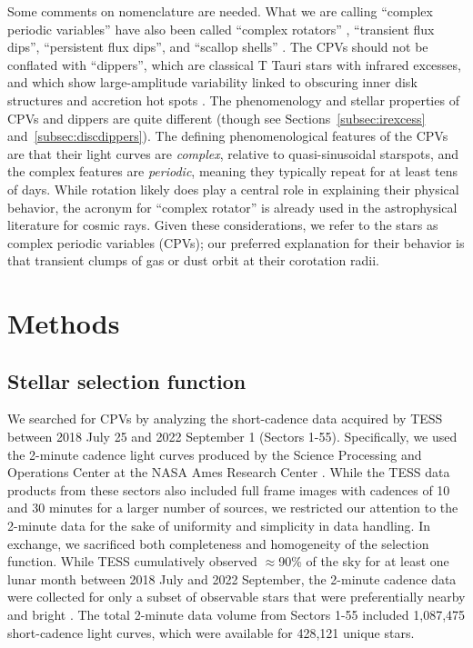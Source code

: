\documentclass[11pt,twocolumn,tighten]{aastex63}
\begin{document}
Some comments on nomenclature are needed.  What we are calling
``complex periodic variables'' \citep{2023MNRAS.518.2921K} have also
been called ``complex rotators''
\citep{2019ApJ...876..127Z,2022AJ....163..144G,2023ApJ...945..114P},
``transient flux dips'', ``persistent flux dips'', and ``scallop
shells'' \citep{2017AJ....153..152S}.  The CPVs should not be
conflated with ``dippers'', which are classical T Tauri stars with
infrared excesses, and which show large-amplitude variability linked
to obscuring inner disk structures and accretion hot spots
\citep{2014AJ....147...82C,2021ApJ...908...16R}.  The phenomenology
and stellar properties of CPVs and dippers are quite different (though
see Sections~\ref{subsec:irexcess} and~\ref{subsec:discdippers}).  The
defining phenomenological features of the CPVs are that their light
curves are {\it complex}, relative to quasi-sinusoidal starspots, and
the complex features are {\it periodic}, meaning they typically repeat
for at least tens of days.  While rotation likely does play a central
role in explaining their physical behavior, the acronym for ``complex
rotator'' is already used in the astrophysical literature for cosmic
rays.  Given these considerations, we refer to the stars as complex
periodic variables (CPVs); our preferred explanation for their
behavior is that transient clumps of gas or dust orbit at their
corotation radii.


\section{Methods}
\label{sec:methods}

\subsection{Stellar selection function}
\label{subsec:selectionfn}

We searched for CPVs by analyzing the short-cadence data acquired by
TESS between 2018 July 25 and 2022 September 1 (Sectors 1-55).
Specifically, we used the 2-minute cadence light curves produced by
the Science Processing and Operations Center at the NASA Ames Research
Center \citep{2016SPIE.9913E..3EJ}.  While the TESS data products from
these sectors also included full frame images with cadences of 10 and
30 minutes for a larger number of sources, we restricted our attention
to the 2-minute data for the sake of uniformity and simplicity in data
handling.  In exchange, we sacrificed both completeness and
homogeneity of the selection function.  While TESS cumulatively
observed $\approx$90\% of the sky for at least one lunar month between
2018 July and 2022 September, the 2-minute cadence data were collected
for only a subset of observable stars that were preferentially nearby
and bright \citep[see][]{2021PASP..133i5002F}.  The total 2-minute
data volume from Sectors 1-55 included 1{,}087{,}475 short-cadence
light curves, which were available for 428{,}121 unique stars.
\end{document}
